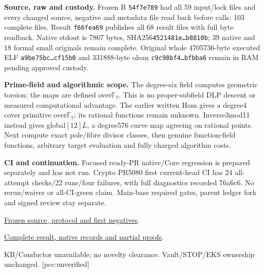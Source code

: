 \documentclass[10pt,a4paper]{article}
\begin{document}
\textbf{Source, raw and custody.} Frozen B \texttt{54f7e789} had all 59
input/lock files and every changed source, negative and metadata file read
back before calls: 103 complete files. Result \texttt{f66fea69} publishes
all 68 result files with full byte readback. Native stdout is 7867 bytes,
SHA256\texttt{4521481e\ldots{}b8810b}; 39 native and 18 formal small
originals remain complete. Original whole 4705736-byte executed ELF
\texttt{a9be75bc\ldots{}cf15b0} and 331888-byte olean
\texttt{c9c98bf4\ldots{}bfbba6} remain in RAM pending approved custody.

\textbf{Prime-field and algorithmic scope.} The degree-six field computes
geometric torsion; the maps are defined over$\mathbb F_7$. This is no
proper-subfield DLP descent or measured computational advantage. The
earlier written Hom gives a degree4 cover primitive over$\mathbb F_7$;
its rational functions remain unknown. Inverse3mod11 instead gives
global$[12]L$, a degree576 curve map agreeing on rational points.
Next compute exact pole/fibre divisor classes, then genuine function-field
functions, arbitrary target evaluation and fully charged algorithm costs.

\textbf{CI and continuation.} Focused ready-PR native/Core regression is
prepared separately and has not run. Crypto PR5080 first current-head CI
has 24 all-attempt checks/22 runs/four failures, with full diagnostics
recorded 76a6c6. No rerun/waiver or all-CI-green claim. Main-base required
gates, parent ledger fork and signed review stay separate.

\href{https://github.com/isogeny-labs/cryptanalysis/tree/54f7e78915475c6a989dd486c1dc0f3e3f0a6ea7/research/chained_cm19_univariate_audit_20261123}{Frozen source, protocol and first negatives}.\par
\href{https://github.com/isogeny-labs/cryptanalysis/tree/f66fea690e4be44306786e66516b59a1a1b5d078/research/chained_cm19_univariate_audit_20261123}{Complete result, native records and partial proofs}.\par
KB/Conductor unavailable; no novelty clearance. Vault/STOP/EKS ownership
unchanged. [pcc:unverified]
\end{document}
